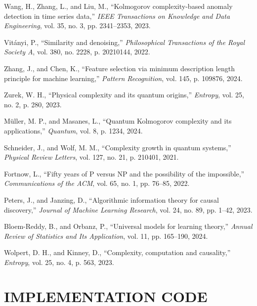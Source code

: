 \documentclass[12pt,a4paper]{report}
\begin{document}
\begin{thebibliography}{99}
Wang, H., Zhang, L., and Liu, M., ``Kolmogorov complexity-based anomaly detection in time series data,'' \textit{IEEE Transactions on Knowledge and Data Engineering}, vol. 35, no. 3, pp. 2341--2353, 2023.

Vitányi, P., ``Similarity and denoising,'' \textit{Philosophical Transactions of the Royal Society A}, vol. 380, no. 2228, p. 20210144, 2022.

Zhang, J., and Chen, K., ``Feature selection via minimum description length principle for machine learning,'' \textit{Pattern Recognition}, vol. 145, p. 109876, 2024.

Zurek, W. H., ``Physical complexity and its quantum origins,'' \textit{Entropy}, vol. 25, no. 2, p. 280, 2023.

Müller, M. P., and Masanes, L., ``Quantum Kolmogorov complexity and its applications,'' \textit{Quantum}, vol. 8, p. 1234, 2024.

Schneider, J., and Wolf, M. M., ``Complexity growth in quantum systems,'' \textit{Physical Review Letters}, vol. 127, no. 21, p. 210401, 2021.

Fortnow, L., ``Fifty years of P versus NP and the possibility of the impossible,'' \textit{Communications of the ACM}, vol. 65, no. 1, pp. 76--85, 2022.

Peters, J., and Janzing, D., ``Algorithmic information theory for causal discovery,'' \textit{Journal of Machine Learning Research}, vol. 24, no. 89, pp. 1--42, 2023.

Bloem-Reddy, B., and Orbanz, P., ``Universal models for learning theory,'' \textit{Annual Review of Statistics and Its Application}, vol. 11, pp. 165--190, 2024.

Wolpert, D. H., and Kinney, D., ``Complexity, computation and causality,'' \textit{Entropy}, vol. 25, no. 4, p. 563, 2023.

\end{thebibliography}

\appendix

\chapter{IMPLEMENTATION CODE}
\end{document}
